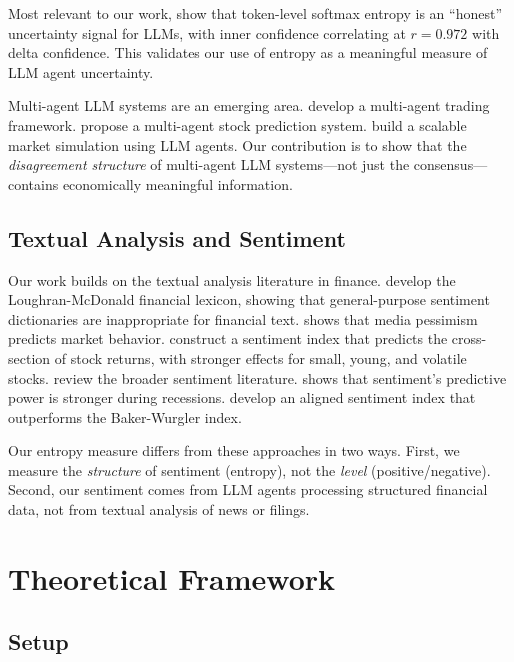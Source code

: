 \documentclass[12pt,a4paper]{article}
\begin{document}
Most relevant to our work, \citet{Chen2025inner} show that token-level softmax entropy is an ``honest'' uncertainty signal for LLMs, with inner confidence correlating at $r = 0.972$ with delta confidence. This validates our use of entropy as a meaningful measure of LLM agent uncertainty.

Multi-agent LLM systems are an emerging area. \citet{TradingAgents2024} develop a multi-agent trading framework. \citet{FinVision2024} propose a multi-agent stock prediction system. \citet{TwinMarket2024} build a scalable market simulation using LLM agents. Our contribution is to show that the \textit{disagreement structure} of multi-agent LLM systems---not just the consensus---contains economically meaningful information.

\subsection{Textual Analysis and Sentiment}

Our work builds on the textual analysis literature in finance. \citet{Loughran2011} develop the Loughran-McDonald financial lexicon, showing that general-purpose sentiment dictionaries are inappropriate for financial text. \citet{Tetlock2007} shows that media pessimism predicts market behavior. \citet{BakerWurgler2006} construct a sentiment index that predicts the cross-section of stock returns, with stronger effects for small, young, and volatile stocks. \citet{BakerWurgler2007} review the broader sentiment literature. \citet{Garcia2013} shows that sentiment's predictive power is stronger during recessions. \citet{Huang2015} develop an aligned sentiment index that outperforms the Baker-Wurgler index.

Our entropy measure differs from these approaches in two ways. First, we measure the \textit{structure} of sentiment (entropy), not the \textit{level} (positive/negative). Second, our sentiment comes from LLM agents processing structured financial data, not from textual analysis of news or filings.

\section{Theoretical Framework}\label{sec:theory}

\subsection{Setup}
\end{document}
